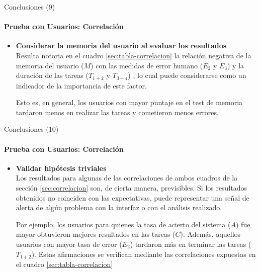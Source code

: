 \begin{frame}{Conclusiones (9)}
\framesubtitle{Prueba con Usuarios: Correlaci\'on}
\begin{itemize}
\item{\textbf{Considerar la memoria del usuario al evaluar los resultados\\}}
Resulta notoria en el cuadro \ref{sec:tabla-correlacion} la relación negativa de la memoria del usuario 
($M$) con las medidas de error humano  ($E_2$ y $E_3$)  y la duraci\'on de las 
tareas ($T_{1+2}$ y $T_{3+4}$) , lo cual puede considerarse como un 
indicador de la importancia de este factor. 

Esto es, en general, los usuarios con mayor puntaje en el 
test de memoria tardaron menos en realizar las tareas y cometieron menos errores.
\end{itemize}
\end{frame}


\begin{frame}{Conclusiones (10)}
\framesubtitle{Prueba con Usuarios: Correlaci\'on}
\begin{itemize}
\item{\textbf{Validar hip\'otesis triviales\\}}
Los resultados para algunas de las correlaciones de ambos cuadros de la sección \ref{sec:correlacion} son,
de cierta manera, previsibles. 
Si los resultados obtenidos no coinciden con las expectativas,
puede representar una se\~nal de alerta de alg\'un problema con la interfaz o con el an\'alisis realizado.

Por ejemplo, los usuarios para quienes la tasa de acierto del sistema ($A$) fue mayor obtuvieron 
mejores resultados en las tareas ($C$). Adem\'as, aquellos usuarios con mayor tasa de error ($E_2$)
tardaron m\'as en terminar las tareas ($T_{1+2}$). Estas afirmaciones se verifican mediante las 
correlaciones expuestas en el cuadro \ref{sec:tabla-correlacion}
\end{itemize}
\end{frame}





